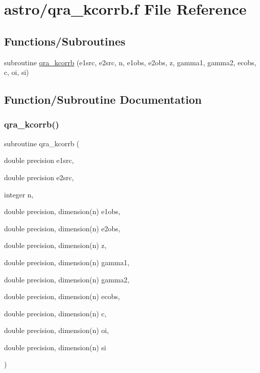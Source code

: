 \hypertarget{qra__kcorrb_8f}{}\section{astro/qra\+\_\+kcorrb.f File Reference}
\label{qra__kcorrb_8f}
\subsection*{Functions/\+Subroutines}
\begin{DoxyCompactItemize}
\item 
subroutine \hyperlink{qra__kcorrb_8f_ab8dadd6c454af098e660a944c03bee27}{qra\+\_\+kcorrb} (e1src, e2src, n, e1obs, e2obs, z, gamma1, gamma2, ecobs, c, oi, si)
\end{DoxyCompactItemize}


\subsection{Function/\+Subroutine Documentation}
\mbox{\label{qra__kcorrb_8f_ab8dadd6c454af098e660a944c03bee27}} 
\subsubsection{\texorpdfstring{qra\+\_\+kcorrb()}{qra\_kcorrb()}}
{\footnotesize\ttfamily subroutine qra\+\_\+kcorrb (\begin{DoxyParamCaption}\item[{double precision}]{e1src,  }\item[{double precision}]{e2src,  }\item[{integer}]{n,  }\item[{double precision, dimension(n)}]{e1obs,  }\item[{double precision, dimension(n)}]{e2obs,  }\item[{double precision, dimension(n)}]{z,  }\item[{double precision, dimension(n)}]{gamma1,  }\item[{double precision, dimension(n)}]{gamma2,  }\item[{double precision, dimension(n)}]{ecobs,  }\item[{double precision, dimension(n)}]{c,  }\item[{double precision, dimension(n)}]{oi,  }\item[{double precision, dimension(n)}]{si }\end{DoxyParamCaption})}

